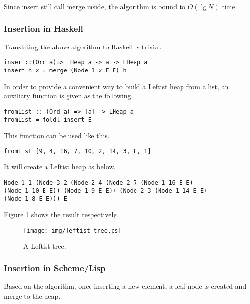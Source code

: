 \documentclass{article}
\begin{document}
Since insert still call merge inside, the algorithm is bound to $O(\lg N)$
time.

\subsubsection*{Insertion in Haskell}

Translating the above algorithm to Haskell is trivial.

\lstset{language=Haskell}
\begin{lstlisting}
insert::(Ord a)=> LHeap a -> a -> LHeap a
insert h x = merge (Node 1 x E E) h
\end{lstlisting}

In order to provide a convenient way to build a Leftist heap from
a list, an auxiliary function is given as the following.

\begin{lstlisting}
fromList :: (Ord a) => [a] -> LHeap a
fromList = foldl insert E
\end{lstlisting}

This function can be used like this.

\begin{lstlisting}
fromList [9, 4, 16, 7, 10, 2, 14, 3, 8, 1]
\end{lstlisting}

It will create a Leftist heap as below.

\begin{verbatim}
Node 1 1 (Node 3 2 (Node 2 4 (Node 2 7 (Node 1 16 E E)
(Node 1 10 E E)) (Node 1 9 E E)) (Node 2 3 (Node 1 14 E E)
(Node 1 8 E E))) E
\end{verbatim}

Figure \ref{fig:leftist-tree} shows the result respectively.

\begin{figure}[htbp]
   \begin{center}
   	  \texttt{[image: img/leftist-tree.ps]}
    \caption{A Leftist tree.} \label{fig:leftist-tree}
   \end{center}
\end{figure}

\subsubsection*{Insertion in Scheme/Lisp}

Based on the algorithm, once inserting a new element, a leaf node
is created and merge to the heap.
\end{document}
